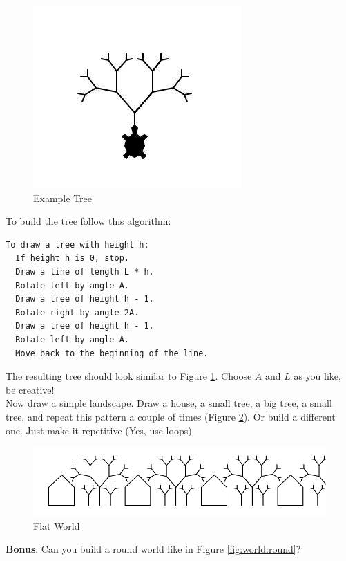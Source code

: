 \begin{figure}[h]
  \includegraphics[scale=0.8]{recursive_tree}
  \caption{Example Tree}
  \label{fig:tree:1}
\end{figure}


\noindent To build the tree follow this algorithm:\\
\begin{lstlisting}
To draw a tree with height h:
  If height h is 0, stop.
  Draw a line of length L * h.
  Rotate left by angle A.
  Draw a tree of height h - 1.
  Rotate right by angle 2A.
  Draw a tree of height h - 1.
  Rotate left by angle A.
  Move back to the beginning of the line.  
\end{lstlisting}

\noindent The resulting tree should look similar to Figure \ref{fig:tree:1}. Choose $A$ and $L$ as you like, be creative!\\
Now draw a simple landscape. Draw a house, a small tree, a big tree, a small tree, and repeat this pattern a couple of times
(Figure \ref{fig:world:flat}). Or build a different one. Just make it repetitive (Yes, use loops).

\begin{figure}[h]
	\includegraphics[width=\textwidth]{flat_world}
	\caption{Flat World}
	\label{fig:world:flat}
\end{figure}

\noindent\textbf{Bonus}: Can you build a round world like in Figure \ref{fig:world:round}?


